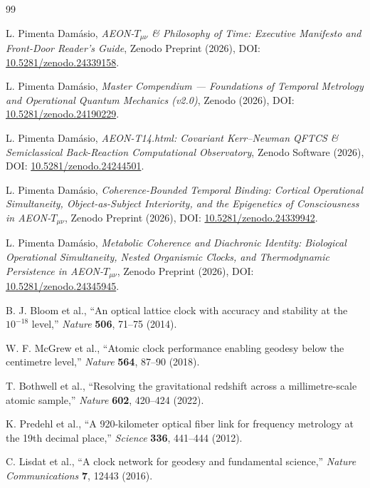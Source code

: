 \documentclass[11pt,a4paper]{article}
\begin{document}
\begin{thebibliography}{99}

L. Pimenta Damásio, \emph{AEON-$T_{\mu\nu}$ \& Philosophy of Time: Executive Manifesto and Front-Door Reader's Guide}, Zenodo Preprint (2026), DOI: \href{https://doi.org/10.5281/zenodo.24339158}{10.5281/zenodo.24339158}.

L. Pimenta Damásio, \emph{Master Compendium --- Foundations of Temporal Metrology and Operational Quantum Mechanics (v2.0)}, Zenodo (2026), DOI: \href{https://doi.org/10.5281/zenodo.24190229}{10.5281/zenodo.24190229}.

L. Pimenta Damásio, \emph{AEON-T14.html: Covariant Kerr--Newman QFTCS \& Semiclassical Back-Reaction Computational Observatory}, Zenodo Software (2026), DOI: \href{https://doi.org/10.5281/zenodo.24244501}{10.5281/zenodo.24244501}.

L. Pimenta Damásio, \emph{Coherence-Bounded Temporal Binding: Cortical Operational Simultaneity, Object-as-Subject Interiority, and the Epigenetics of Consciousness in AEON-$T_{\mu\nu}$}, Zenodo Preprint (2026), DOI: \href{https://doi.org/10.5281/zenodo.24339942}{10.5281/zenodo.24339942}.

L. Pimenta Damásio, \emph{Metabolic Coherence and Diachronic Identity: Biological Operational Simultaneity, Nested Organismic Clocks, and Thermodynamic Persistence in AEON-$T_{\mu\nu}$}, Zenodo Preprint (2026), DOI: \href{https://doi.org/10.5281/zenodo.24345945}{10.5281/zenodo.24345945}.

B. J. Bloom et al., ``An optical lattice clock with accuracy and stability at the $10^{-18}$ level,'' \emph{Nature} \textbf{506}, 71--75 (2014).

W. F. McGrew et al., ``Atomic clock performance enabling geodesy below the centimetre level,'' \emph{Nature} \textbf{564}, 87--90 (2018).

T. Bothwell et al., ``Resolving the gravitational redshift across a millimetre-scale atomic sample,'' \emph{Nature} \textbf{602}, 420--424 (2022).

K. Predehl et al., ``A 920-kilometer optical fiber link for frequency metrology at the 19th decimal place,'' \emph{Science} \textbf{336}, 441--444 (2012).

C. Lisdat et al., ``A clock network for geodesy and fundamental science,'' \emph{Nature Communications} \textbf{7}, 12443 (2016).


\end{thebibliography}
\end{document}

